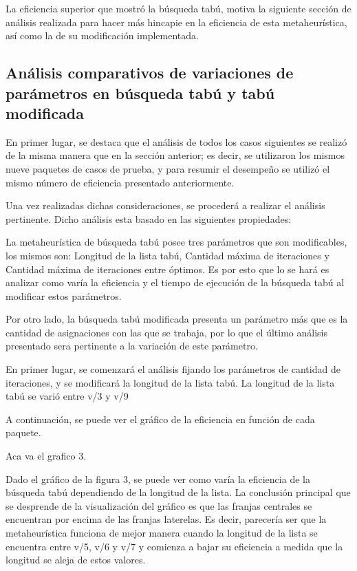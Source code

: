 \documentclass[a4paper,10pt]{article}
\begin{document}
\bigskip

La eficiencia superior que mostr\'o la b\'usqueda tab\'u, motiva la siguiente secci\'on de an\'alisis realizada para hacer m\'as hincapie en la eficiencia de esta metaheur\'istica, as\'i como la de su modificaci\'on implementada.

\subsection*{An\'alisis comparativos de variaciones de par\'ametros en b\'usqueda tab\'u y tab\'u modificada}

En primer lugar, se destaca que el an\'alisis de todos los casos siguientes se realiz\'o de la misma manera que en la secci\'on anterior; es decir, se utilizaron los mismos nueve paquetes de casos de prueba, y para resumir el desempe\~{n}o se utiliz\'o el mismo n\'umero de eficiencia presentado anteriormente.

Una vez realizadas dichas consideraciones, se proceder\'a a realizar el an\'alisis pertinente. Dicho an\'alisis esta basado en las siguientes propiedades: 

La metaheur\'istica de b\'usqueda tab\'u posee tres par\'ametros que son modificables, los mismos son: Longitud de la lista tab\'u, Cantidad m\'axima de iteraciones y Cantidad m\'axima de iteraciones entre \'optimos. Es por esto que lo se har\'a es analizar como var\'ia la eficiencia y el tiempo de ejecuci\'on de la b\'usqueda tab\'u al modificar estos par\'ametros.

Por otro lado, la b\'usqueda tab\'u modificada presenta un par\'ametro m\'as que es la cantidad de asignaciones con las que se trabaja, por lo que el \'ultimo an\'alisis presentado sera pertinente a la variaci\'on de este par\'ametro.

\bigskip

En primer lugar, se comenzar\'a el an\'alisis fijando los par\'ametros de cantidad de iteraciones, y se modificar\'a la longitud de la lista tab\'u. La longitud de la lista tab\'u se vari\'o entre v/3 y v/9

A continuaci\'on, se puede ver el gr\'afico de la eficiencia en funci\'on de cada paquete. 

Aca va el grafico 3.

Dado el gr\'afico de la figura 3, se puede ver como var\'ia la eficiencia de la b\'usqueda tab\'u dependiendo de la longitud de la lista. La conclusi\'on principal que se desprende de la visualizaci\'on del gr\'afico es que las franjas centrales se encuentran por encima de las franjas laterelas. Es decir, parecer\'ia ser que la metaheur\'istica funciona de mejor manera cuando la longitud de la lista se encuentra entre v/5, v/6 y v/7 y comienza a bajar su eficiencia a medida que la longitud se aleja de estos valores.
\end{document}
